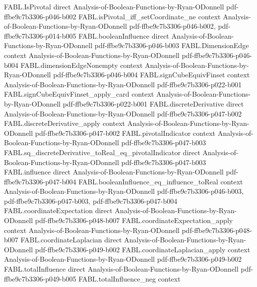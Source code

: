 \begin{theorem}
\proofstep
  {FABL.IsPivotal}
  {direct}
  {Analysis-of-Boolean-Functions-by-Ryan-ODonnell}
  {pdf-ffbe9c7b3306-p046-b002}
\proofstep
  {FABL.isPivotal_iff_setCoordinate_ne}
  {context}
  {Analysis-of-Boolean-Functions-by-Ryan-ODonnell}
  {pdf-ffbe9c7b3306-p046-b002,
    pdf-ffbe9c7b3306-p014-b005}
\proofstep
  {FABL.booleanInfluence}
  {direct}
  {Analysis-of-Boolean-Functions-by-Ryan-ODonnell}
  {pdf-ffbe9c7b3306-p046-b003}
\proofstep
  {FABL.DimensionEdge}
  {context}
  {Analysis-of-Boolean-Functions-by-Ryan-ODonnell}
  {pdf-ffbe9c7b3306-p046-b004}
\proofstep
  {FABL.dimensionEdgeNonempty}
  {context}
  {Analysis-of-Boolean-Functions-by-Ryan-ODonnell}
  {pdf-ffbe9c7b3306-p046-b004}
\proofstep
  {FABL.signCubeEquivFinset}
  {context}
  {Analysis-of-Boolean-Functions-by-Ryan-ODonnell}
  {pdf-ffbe9c7b3306-p022-b001}
\proofstep
  {FABL.signCubeEquivFinset_apply_card}
  {context}
  {Analysis-of-Boolean-Functions-by-Ryan-ODonnell}
  {pdf-ffbe9c7b3306-p022-b001}
\proofstep
  {FABL.discreteDerivative}
  {direct}
  {Analysis-of-Boolean-Functions-by-Ryan-ODonnell}
  {pdf-ffbe9c7b3306-p047-b002}
\proofstep
  {FABL.discreteDerivative_apply}
  {context}
  {Analysis-of-Boolean-Functions-by-Ryan-ODonnell}
  {pdf-ffbe9c7b3306-p047-b002}
\proofstep
  {FABL.pivotalIndicator}
  {context}
  {Analysis-of-Boolean-Functions-by-Ryan-ODonnell}
  {pdf-ffbe9c7b3306-p047-b003}
\proofstep
  {FABL.sq_discreteDerivative_toReal_eq_pivotalIndicator}
  {direct}
  {Analysis-of-Boolean-Functions-by-Ryan-ODonnell}
  {pdf-ffbe9c7b3306-p047-b003}
\proofstep
  {FABL.influence}
  {direct}
  {Analysis-of-Boolean-Functions-by-Ryan-ODonnell}
  {pdf-ffbe9c7b3306-p047-b004}
\proofstep
  {FABL.booleanInfluence_eq_influence_toReal}
  {context}
  {Analysis-of-Boolean-Functions-by-Ryan-ODonnell}
  {pdf-ffbe9c7b3306-p046-b003,
    pdf-ffbe9c7b3306-p047-b003,
    pdf-ffbe9c7b3306-p047-b004}
\proofstep
  {FABL.coordinateExpectation}
  {direct}
  {Analysis-of-Boolean-Functions-by-Ryan-ODonnell}
  {pdf-ffbe9c7b3306-p048-b007}
\proofstep
  {FABL.coordinateExpectation_apply}
  {context}
  {Analysis-of-Boolean-Functions-by-Ryan-ODonnell}
  {pdf-ffbe9c7b3306-p048-b007}
\proofstep
  {FABL.coordinateLaplacian}
  {direct}
  {Analysis-of-Boolean-Functions-by-Ryan-ODonnell}
  {pdf-ffbe9c7b3306-p049-b002}
\proofstep
  {FABL.coordinateLaplacian_apply}
  {context}
  {Analysis-of-Boolean-Functions-by-Ryan-ODonnell}
  {pdf-ffbe9c7b3306-p049-b002}
\proofstep
  {FABL.totalInfluence}
  {direct}
  {Analysis-of-Boolean-Functions-by-Ryan-ODonnell}
  {pdf-ffbe9c7b3306-p049-b005}
\proofstep
  {FABL.totalInfluence_neg}
  {context}

\end{theorem}
